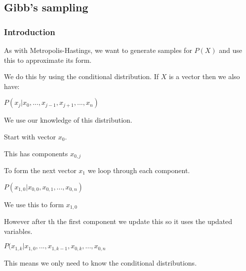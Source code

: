
\subsection{Gibb's sampling}

\subsubsection{Introduction}

As with Metropolis-Hastings, we want to generate samples for \(P(X)\) and use this to approximate its form.

We do this by using the conditional distribution. If \(X\) is a vector then we also have:

\(P(x_j|x_0,...,x_{j-1},x_{j+1},...,x_n)\)

We use our knowledge of this distribution.

Start with vector \(x_0\).

This has components \(x_{0,j}\)

To form the next vector \(x_1\) we loop through each component.

\(P(x_{1,0}|x_{0,0},x_{0,1},...,x_{0,n})\)

We use this to form \(x_{1,0}\)

However after th the first component we update this so it uses the updated variables.

\(P(x_{1,k}|x_{1,0},...,x_{1,k-1},x_{0,k},...,x_{0,n}\)

This means we only need to know the conditional distributions.

